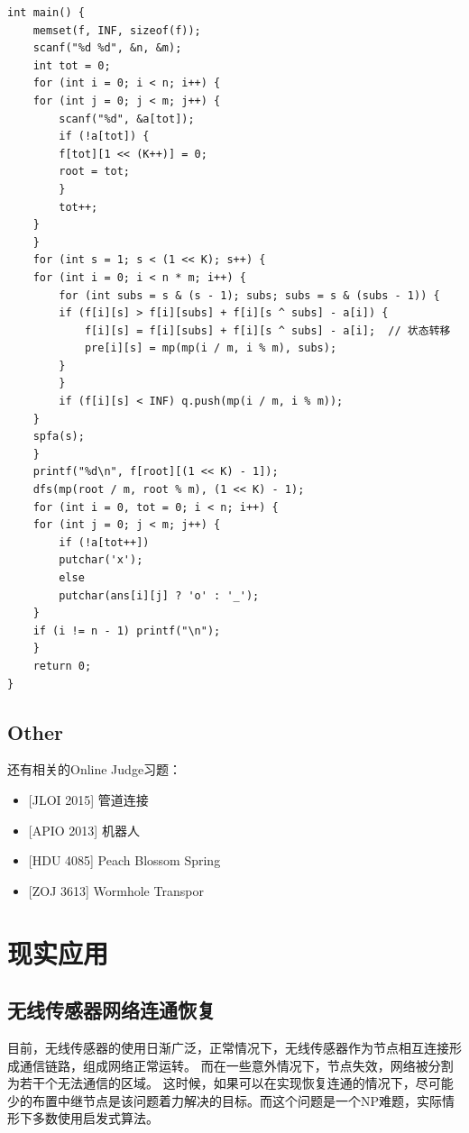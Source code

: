 \documentclass{SCIS2022cn}
\begin{document}
\begin{lstlisting}
int main() {
    memset(f, INF, sizeof(f));
    scanf("%d %d", &n, &m);
    int tot = 0;
    for (int i = 0; i < n; i++) {
    for (int j = 0; j < m; j++) {
        scanf("%d", &a[tot]);
        if (!a[tot]) {
        f[tot][1 << (K++)] = 0;
        root = tot;
        }
        tot++;
    }
    }
    for (int s = 1; s < (1 << K); s++) {
    for (int i = 0; i < n * m; i++) {
        for (int subs = s & (s - 1); subs; subs = s & (subs - 1)) {
        if (f[i][s] > f[i][subs] + f[i][s ^ subs] - a[i]) {
            f[i][s] = f[i][subs] + f[i][s ^ subs] - a[i];  // 状态转移
            pre[i][s] = mp(mp(i / m, i % m), subs);
        }
        }
        if (f[i][s] < INF) q.push(mp(i / m, i % m));
    }
    spfa(s);
    }
    printf("%d\n", f[root][(1 << K) - 1]);
    dfs(mp(root / m, root % m), (1 << K) - 1);
    for (int i = 0, tot = 0; i < n; i++) {
    for (int j = 0; j < m; j++) {
        if (!a[tot++])
        putchar('x');
        else
        putchar(ans[i][j] ? 'o' : '_');
    }
    if (i != n - 1) printf("\n");
    }
    return 0;
}
\end{lstlisting}

\subsection{Other}

还有相关的Online Judge习题：

\begin{itemize}
    \item {[JLOI 2015]} 管道连接
    \item {[APIO 2013]} 机器人
    \item {[HDU 4085]} Peach Blossom Spring
    \item {[ZOJ 3613]} Wormhole Transpor
\end{itemize}

\section{现实应用}

\subsection{无线传感器网络连通恢复}

目前，无线传感器的使用日渐广泛，正常情况下，无线传感器作为节点相互连接形成通信链路，组成网络正常运转。
而在一些意外情况下，节点失效，网络被分割为若干个无法通信的区域。
这时候，如果可以在实现恢复连通的情况下，尽可能少的布置中继节点是该问题着力解决的目标。而这个问题是一个NP难题，实际情形下多数使用启发式算法。
\end{document}

